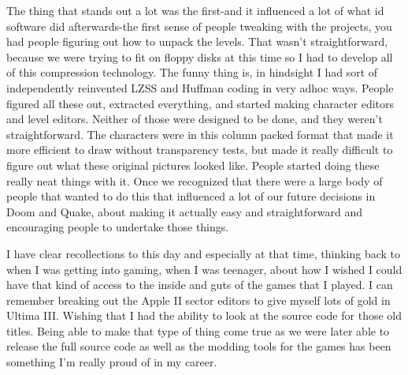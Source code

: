 The thing that stands out a lot was the first-and it influenced a lot of what id software did afterwards-the first sense of people tweaking with the projects, you had people figuring out how to unpack the levels. That wasn't straightforward, because we were trying to fit on floppy disks at this time so I had to develop all of this compression technology. The funny thing is, in hindsight I had sort of independently reinvented LZSS and Huffman coding in very adhoc ways. People figured all these out, extracted everything, and started making character editors and level editors. Neither of those were designed to be done, and they weren't straightforward. The characters were in this column packed format that made it more efficient to draw without transparency tests, but made it really difficult to figure out what these original pictures looked like. People started doing these really neat things with it. Once we recognized that there were a large body of people that wanted to do this that influenced a lot of our future decisions in Doom and Quake, about making it actually easy and straightforward and encouraging people to undertake those things.\\ \par

I have clear recollections to this day and especially at that time, thinking back to when I was getting into gaming, when I was teenager, about how I wished I could have that kind of access to the inside and guts of the games that I played. I can remember breaking out the Apple II sector editors to give myself lots of gold in Ultima III. Wishing that I had the ability to look at the source code for those old titles. Being able to make that type of thing come true as we were later able to release the full source code as well as the modding tools for the games has been something I'm really proud of in my career.\\ \par

